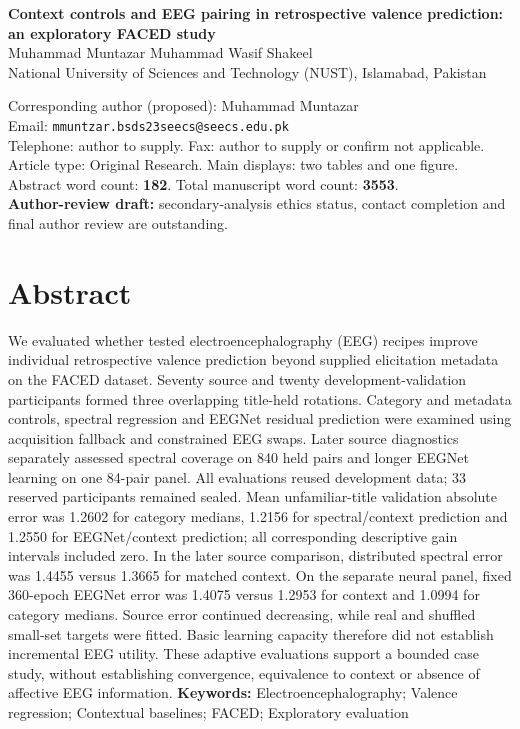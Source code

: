 \documentclass[12pt,a4paper]{article}
\begin{document}
\begin{center}
{\Large\bfseries Context controls and EEG pairing in retrospective valence prediction: an exploratory FACED study}\\[12pt]
Muhammad Muntazar \quad Muhammad Wasif Shakeel\\[8pt]
National University of Sciences and Technology (NUST), Islamabad, Pakistan
\end{center}
\noindent Corresponding author (proposed): Muhammad Muntazar\\
Email: \nolinkurl{mmuntzar.bsds23seecs@seecs.edu.pk}\\
Telephone: author to supply. Fax: author to supply or confirm not applicable.\\
Article type: Original Research. Main displays: two tables and one figure.\\
Abstract word count: \textbf{182}. Total manuscript word count: \textbf{3553}.\\
\textbf{Author-review draft:} secondary-analysis ethics status, contact completion and final author review are outstanding.
\clearpage
\section*{Abstract}
We evaluated whether tested electroencephalography (EEG) recipes improve individual retrospective valence prediction beyond supplied elicitation metadata on the FACED dataset. Seventy source and twenty development-validation participants formed three overlapping title-held rotations. Category and metadata controls, spectral regression and EEGNet residual prediction were examined using acquisition fallback and constrained EEG swaps. Later source diagnostics separately assessed spectral coverage on 840 held pairs and longer EEGNet learning on one 84-pair panel. All evaluations reused development data; 33 reserved participants remained sealed. Mean unfamiliar-title validation absolute error was 1.2602 for category medians, 1.2156 for spectral/context prediction and 1.2550 for EEGNet/context prediction; all corresponding descriptive gain intervals included zero. In the later source comparison, distributed spectral error was 1.4455 versus 1.3665 for matched context. On the separate neural panel, fixed 360-epoch EEGNet error was 1.4075 versus 1.2953 for context and 1.0994 for category medians. Source error continued decreasing, while real and shuffled small-set targets were fitted. Basic learning capacity therefore did not establish incremental EEG utility. These adaptive evaluations support a bounded case study, without establishing convergence, equivalence to context or absence of affective EEG information.
\noindent\textbf{Keywords:} Electroencephalography; Valence regression; Contextual baselines; FACED; Exploratory evaluation
\linenumbers
\end{document}
